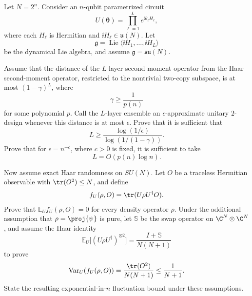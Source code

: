 Let $N=2^n$.  Consider an $n$-qubit parametrized circuit
$$
    U(\boldsymbol\theta)
    =
    \prod_{\ell=1}^L e^{\ii\theta_\ell H_\ell},
$$
where each $H_\ell$ is Hermitian and $\ii H_\ell\in\mathfrak u(N)$.  Let
$$
    \mathfrak g=\operatorname{Lie}\langle \ii H_1,\dots,\ii H_L\rangle
$$
be the dynamical Lie algebra, and assume $\mathfrak g=\mathfrak{su}(N)$.

Assume that the distance of the $L$-layer second-moment operator from the Haar second-moment operator, restricted to the nontrivial two-copy subspace, is at most $(1-\gamma)^L$, where
$$
    \gamma\geq \frac1{p(n)}
$$
for some polynomial $p$.  Call the $L$-layer ensemble an $\epsilon$-approximate unitary $2$-design whenever this distance is at most $\epsilon$.  Prove that it is sufficient that
$$
    L
    \geq
    \frac{\log(1/\epsilon)}
    {\log(1/(1-\gamma))}.
$$
Prove that for $\epsilon=n^{-c}$, where $c>0$ is fixed, it is sufficient to take
$$
    L=O(p(n)\log n).
$$

Now assume exact Haar randomness on $SU(N)$.  Let $O$ be a traceless Hermitian observable with $\tr(O^2)\leq N$, and define
$$
    f_U(\rho,O)=\tr(U\rho U^\dagger O).
$$
Prove that $\mathbb E_U f_U(\rho,O)=0$ for every density operator $\rho$.  Under the additional assumption that $\rho=\proj{\psi}$ is pure, let $\mathbb S$ be the swap operator on $\C^N\otimes\C^N$, and assume the Haar identity
$$
    \mathbb E_U\bigl[(U\rho U^\dagger)^{\otimes2}\bigr]
    =
    \frac{I+\mathbb S}{N(N+1)}
$$
to prove
$$
    \operatorname{Var}_U(f_U(\rho,O))
    =
    \frac{\tr(O^2)}{N(N+1)}
    \leq
    \frac1{N+1}.
$$
State the resulting exponential-in-$n$ fluctuation bound under these assumptions.
